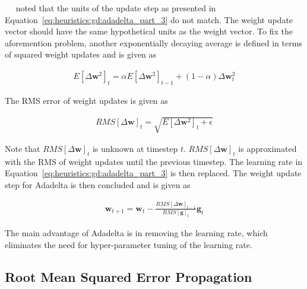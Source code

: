 ~\citeauthor{ref:zeiler:2012}~\cite{ref:zeiler:2012} noted that the units of the update step as presented in Equation~\eqref{eq:heuristics:gd:adadelta_part_3} do not match. The weight update vector should have the same hypothetical units as the weight vector. To fix the aforemention problem, another exponentially decaying average is defined in terms of squared weight updates and is given as

\begin{equation}
      \label{eq:heuristics:gd:adadelta_part_4}
      \begin{split}
            E[\Delta \boldsymbol{w}^{2}]_{t} = \alpha E[\Delta \boldsymbol{w}^{2}]_{t - 1} + (1 - \alpha)\Delta \boldsymbol{w}_{t}^{2}
      \end{split}
\end{equation}

The \acf{RMS} error of weight updates is given as

\begin{equation}
      \label{eq:heuristics:gd:adadelta_part_5}
      \begin{split}
            RMS[\Delta \boldsymbol{w}]_{t} = \sqrt{E[\Delta \boldsymbol{w}^{2}]_{t} + \epsilon}
      \end{split}
\end{equation}

Note that $RMS[\Delta \boldsymbol{w}]_{t}$ is unknown at timestep $t$. $RMS[\Delta \boldsymbol{w}]_{t}$ is approximated with the \acf{RMS} of weight updates until the previous timestep. The learning rate in Equation~\eqref{eq:heuristics:gd:adadelta_part_3} is then replaced. The weight update step for \acs{Adadelta} is then concluded and is given as

\begin{equation}
      \label{eq:heuristics:gd:adadelta_part_6}
      \begin{split}
            \boldsymbol{w}_{t+1} = \boldsymbol{w}_{t} - \frac{RMS[\Delta \boldsymbol{w}]_{t-1}}{RMS[\boldsymbol{g}]_{t}} \boldsymbol{g}_{t}
      \end{split}
\end{equation}

The main advantage of \acs{Adadelta} is in removing the learning rate, which eliminates the need for hyper-parameter tuning of the learning rate.

\subsection{Root Mean Squared Error Propagation}\label{sec:heuristics:rmsprop}

